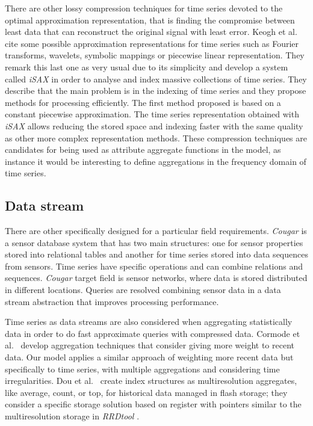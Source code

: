 There are other lossy compression techniques for time series devoted
to the optimal approximation representation, that is finding the
compromise between least data that can reconstruct the original signal
with least error. Keogh et al.\ \cite{keogh01} cite some possible
approximation representations for time series such as Fourier
transforms, wavelets, symbolic mappings or piecewise linear
representation. They remark this last one as very usual due to its
simplicity and develop a system called \emph{iSAX}
\cite{keogh08:isax,keogh10:isax} in order to analyse and index massive
collections of time series. They describe that the main problem is in
the indexing of time series and they propose methods for processing
efficiently. The first method proposed is based on a constant
piecewise approximation. The time series representation obtained with
\emph{iSAX} allows reducing the stored space and indexing faster with
the same quality as other more complex representation methods.  These
compression techniques are candidates for being used as attribute
aggregate functions in the  model, as instance it would be
interesting to define aggregations in the frequency domain of time
series.


 


\subsection{Data stream}



There are other  specifically designed for a particular
field requirements.  \emph{Cougar} \cite{bonnet01} is a sensor
database system that has two main structures: one for sensor
properties stored into relational tables and another for time series
stored into data sequences from sensors. Time series have specific
operations and can combine relations and sequences. \emph{Cougar}
target field is sensor networks, where data is stored distributed in
different locations. Queries are resolved combining sensor data in a
data stream abstraction that improves processing performance.

Time series as data streams are also considered when aggregating
statistically data in order to do fast approximate queries with
compressed data. Cormode et al.\ \cite{cormode08:pods} develop
aggregation techniques that consider giving more weight to recent
data.  Our  model applies a similar approach of
weighting more recent data but specifically to time series, with
multiple aggregations and considering time irregularities.  Dou et
al.\ \cite{dou14:historic_queries_flash_storage} create index
structures as multiresolution aggregates, like average, count, or top,
for historical data managed in flash storage; they consider a specific
storage solution based on register with pointers similar to the
multiresolution storage in \emph{RRDtool} \cite{lisa98:oetiker}.






